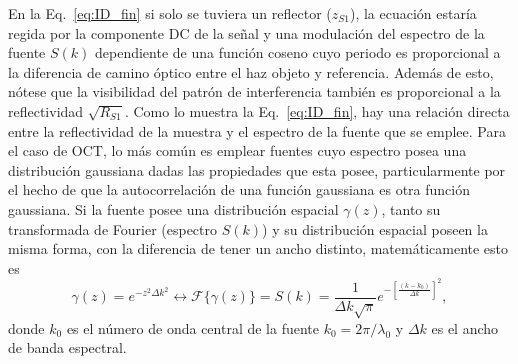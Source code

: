 


En la Eq.~\ref{eq:ID_fin} si solo se tuviera un reflector ($z_{S1}$), la ecuación estaría regida por la componente DC de la señal y una modulación del espectro de la fuente $S(k)$ dependiente de una función coseno cuyo periodo es proporcional a la diferencia de camino óptico entre el haz objeto y referencia. Además de esto, nótese que la visibilidad del patrón de interferencia también es proporcional a la reflectividad $\sqrt{R_{S1}}$. Como lo muestra la Eq.~\ref{eq:ID_fin}, hay una relación directa entre la reflectividad de la muestra y el espectro de la fuente que se emplee. Para el caso de OCT, lo más común es emplear fuentes cuyo espectro posea una distribución gaussiana dadas las propiedades que esta posee, particularmente por el hecho de que la autocorrelación de una función gaussiana es otra función gaussiana. Si la fuente posee una distribución espacial $\gamma(z)$, tanto su transformada de Fourier (espectro $S(k)$) y su distribución espacial poseen la misma forma, con la diferencia de tener un ancho distinto, matemáticamente esto es
\begin{equation}
\gamma (z) = e^{-z^2\Delta k^2} \leftrightarrow \mathscr{F}\{\gamma (z)\} = S(k) = \frac{1}{\Delta k \sqrt{\pi}} e^{-\left[\frac{(k-k_0)}{\Delta k}\right]^2},
\end{equation}
\noindent donde $k_0$ es el número de onda central de la fuente $k_0 = 2\pi / \lambda_0$ y $\Delta k$ es el ancho de banda espectral.


